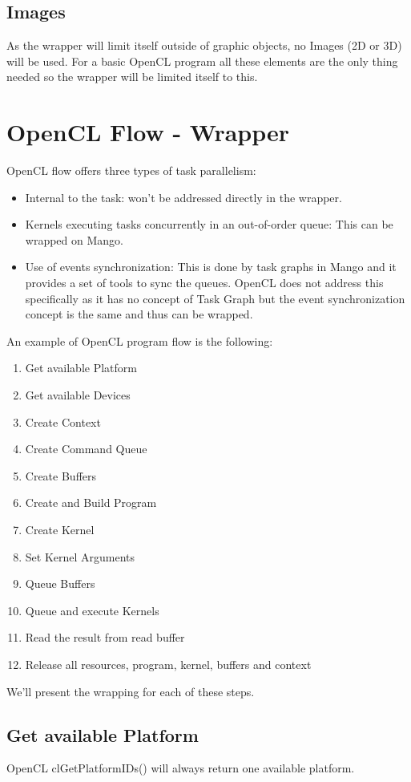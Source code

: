 \documentclass[a4paper]{article}
\begin{document}
\subsection{Images}
As the wrapper will limit itself outside of graphic objects, no Images (2D or 3D) will be used.
For a basic OpenCL program all these elements are the only thing needed so the wrapper will be limited itself to this.

\section{OpenCL Flow - Wrapper}
OpenCL flow offers three types of task parallelism: 
\begin{itemize}
	\item Internal to the task: won't be addressed directly in the wrapper.
	\item Kernels executing tasks concurrently in an out-of-order queue: This can be wrapped on Mango.
	\item Use of events synchronization: This is done by task graphs in Mango and it provides a set of tools to sync the queues. OpenCL does not address this specifically as it has no concept of Task Graph but the event synchronization concept is the same and thus can be wrapped.
\end{itemize} 
 An example of OpenCL program flow is the following:
\begin{enumerate}
	\item Get available Platform
        	\item Get available Devices
	\item Create Context
	\item Create Command Queue
	\item Create Buffers
	\item Create and Build Program
	\item Create Kernel
	\item Set Kernel Arguments
	\item Queue Buffers
	\item Queue and execute Kernels
	\item Read the result from read buffer
	\item Release all resources, program, kernel, buffers and context
\end{enumerate}
We'll present the wrapping for each of these steps.

\subsection{Get available Platform}
OpenCL \ttfamily clGetPlatformIDs() \rmfamily will always return one available platform.
\end{document}
